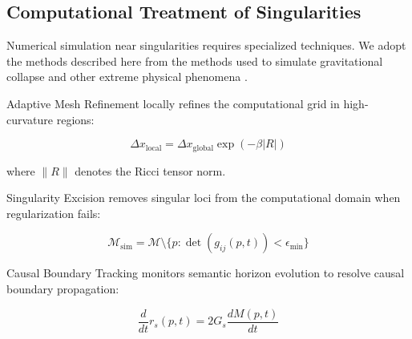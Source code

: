 
\subsection{Computational Treatment of Singularities}
\label{sec:computational_treatment_of_singularities}

Numerical simulation near singularities requires specialized techniques. We adopt the methods described here from the methods used to simulate gravitational collapse and other extreme physical phenomena \autocite{BaumgarteShapiro2010}.

Adaptive Mesh Refinement locally refines the computational grid in high-curvature regions:

\begin{equation}
\Delta x_{\text{local}} = \Delta x_{\text{global}} \exp(-\beta |R|)
\end{equation}

where \(\|R\|\) denotes the Ricci tensor norm.

Singularity Excision removes singular loci from the computational domain when regularization fails:

\begin{equation}
\mathcal{M}_{\text{sim}} = \mathcal{M} \setminus \{p : \det(g_{ij}(p, t)) < \epsilon_{\text{min}}\}
\end{equation}

Causal Boundary Tracking monitors semantic horizon evolution to resolve causal boundary propagation:

\begin{equation}
\frac{d}{dt} r_s(p, t) = 2G_s \frac{dM(p, t)}{dt}
\end{equation}